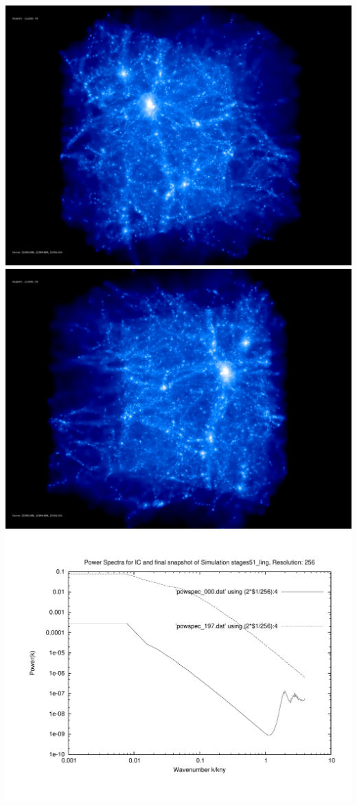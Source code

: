 \includegraphics[scale=0.1]{r256/h100/stages51_ling/rotate_00074.jpg} 
\includegraphics[scale=0.1]{r256/h100/stages51_ling/rotate_00131.jpg}  \\

\includegraphics[scale=0.5]{r256/h100/stages51_ling/plot_powspec_stages51_ling}

